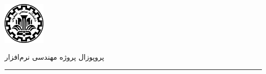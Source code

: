 \begin{minipage}{0.1\textwidth}
\includegraphics[width=2cm]{etc/IUTLogo}
\end{minipage}%
\hfill%
\begin{minipage}{0.6\textwidth}\centering
\fontsize{10pt}{10pt}\selectfont
پروپوزال پروژه مهندسی نرم‌افزار \\
\vspace{0.25cm}

\end{minipage}%
\hfill%
\begin{minipage}{0.1\textwidth}

\end{minipage}

\vspace{0.5cm}

\noindent\rule{\textwidth}{1pt}